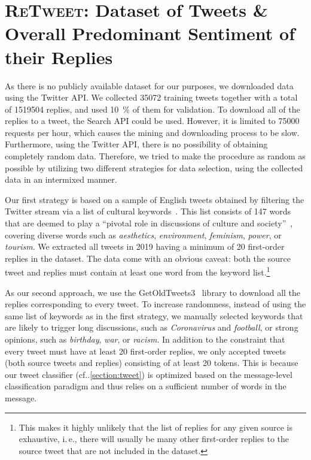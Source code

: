 \documentclass[conference]{IEEEtran}
\makeatletter
\DeclareRobustCommand\onedot{\futurelet\@let@token\@onedot}
\def\@onedot{\ifx\@let@token.\else.\null\fi\xspace}
\newcommand{\cf}{cf\onedot}
\newcommand{\ie}{i.\,e.,\xspace}
\newcommand{\retweet}{\textsc{ReTweet}\xspace}
\makeatother
\begin{document}
\section{\retweet: Dataset of Tweets \& Overall Predominant Sentiment of their Replies}
\label{section:data}
As there is no publicly available dataset for our purposes, we downloaded data using the Twitter API. We collected \num{35072} training tweets together with a total of \num{1519504} replies, and used \SI{10}{\percent} of them for validation.
To download all of the replies to a tweet, the Search API could be used. However, it is limited to \num{75000} requests per hour, which causes the mining and downloading process to be slow.
Furthermore, using the Twitter API, there is no possibility of obtaining completely random data. Therefore, we tried to make the procedure as random as possible by utilizing two different strategies for data selection, using the collected data in an intermixed manner.

Our first strategy is based on a sample of English tweets obtained by filtering the Twitter stream via a list of cultural keywords~\cite{bennett2005new}. This list consists of 147 words that are deemed to play a ``pivotal role in discussions of culture and society''~\cite[xvii]{bennett2005new}, covering diverse words such as \emph{aesthetics}, \emph{environment}, \emph{feminism}, \emph{power}, or \emph{tourism}. We extracted all tweets in 2019 having a minimum of 20 first-order replies in the dataset. The data come with an obvious caveat: both the source tweet and replies must contain at least one word from the keyword list.\footnote{This makes it highly unlikely that the list of replies for any given source is exhaustive, \ie there will usually be many other first-order replies to the source tweet that are not included in the dataset.} 

As our second approach, we use the GetOldTweets3~\cite{GetOldTweets3} library to download all the replies corresponding to every tweet. To increase randomness, instead of using the same list of keywords as in the first strategy, we manually selected keywords that are likely to trigger long discussions, such as \emph{Coronavirus} and \emph{football}, or strong opinions, such as \emph{birthday}, \emph{war}, or \emph{racism}. In addition to the constraint that every tweet must have at least 20 first-order replies, 
we only accepted tweets (both source tweets and replies) consisting of at least 20 tokens. This is because our tweet classifier (\cf\cref{section:tweet}) is optimized based on the message-level classification paradigm and thus relies on a sufficient number of words in the message.
\end{document}
